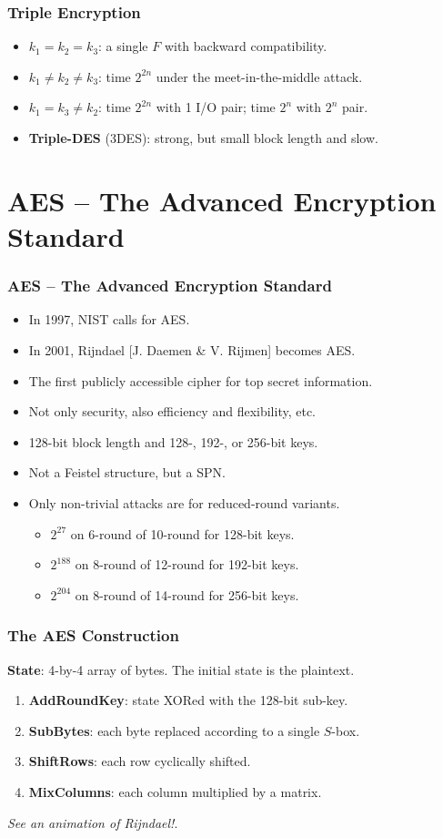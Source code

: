 \begin{frame}\frametitle{Triple Encryption}
\begin{figure}
\begin{center}

\end{center}
\end{figure}
\begin{itemize}
\item $k_1 = k_2 = k_3$: a single $F$ with backward compatibility.
\item $k_1 \neq k_2 \neq k_3$: time $2^{2n}$ under the meet-in-the-middle attack.
\item $k_1 = k_3 \neq k_2$: time $2^{2n}$ with 1 I/O pair; time $2^{n}$ with $2^n$ pair.
\item \textbf{Triple-DES} (3DES): strong, but small block length and slow.
\end{itemize}
\end{frame}
\section{AES -- The Advanced Encryption Standard}
\begin{frame}\frametitle{AES -- The Advanced Encryption Standard}
\begin{itemize}
\item In 1997, NIST calls for AES.
\item In 2001, Rijndael [J. Daemen \& V. Rijmen] becomes AES.
\item The first publicly accessible cipher for top secret information.
\item Not only security, also efficiency and flexibility, etc.
\item 128-bit block length and 128-, 192-, or 256-bit keys.
\item Not a Feistel structure, but a SPN.
\item Only non-trivial attacks are for reduced-round variants.
\begin{itemize}
\item $2^{27}$ on 6-round of 10-round for 128-bit keys.
\item $2^{188}$ on 8-round of 12-round for 192-bit keys.
\item $2^{204}$ on 8-round of 14-round for 256-bit keys. 
\end{itemize}
\end{itemize}
\end{frame}
\begin{frame}\frametitle{The AES Construction}
\textbf{State}: 4-by-4 array of bytes. The initial state is the plaintext.
\begin{enumerate}
\item \textbf{AddRoundKey}: state XORed with the 128-bit sub-key.
\item \textbf{SubBytes}: each byte replaced according to a single $S$-box.
\item \textbf{ShiftRows}: each row cyclically shifted. 
\item \textbf{MixColumns}: each column multiplied by a matrix.
\end{enumerate}
\emph{See an animation of Rijndael!}.
\end{frame}
